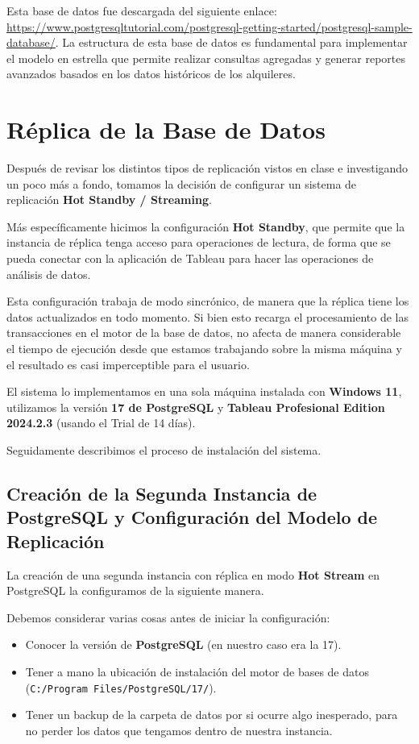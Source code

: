 \documentclass{article}
\begin{document}
Esta base de datos fue descargada del siguiente enlace: \url{https://www.postgresqltutorial.com/postgresql-getting-started/postgresql-sample-database/}. La estructura de esta base de datos es fundamental para implementar el modelo en estrella que permite realizar consultas agregadas y generar reportes avanzados basados en los datos históricos de los alquileres.

\newpage
\section{Réplica de la Base de Datos}

Después de revisar los distintos tipos de replicación vistos en clase e investigando un poco más a fondo, tomamos la decisión de configurar un sistema de replicación \textbf{Hot Standby / Streaming}.

Más específicamente hicimos la configuración \textbf{Hot Standby}, que permite que la instancia de réplica tenga acceso para operaciones de lectura, de forma que se pueda conectar con la aplicación de Tableau para hacer las operaciones de análisis de datos.

Esta configuración trabaja de modo sincrónico, de manera que la réplica tiene los datos actualizados en todo momento. Si bien esto recarga el procesamiento de las transacciones en el motor de la base de datos, no afecta de manera considerable el tiempo de ejecución desde que estamos trabajando sobre la misma máquina y el resultado es casi imperceptible para el usuario.

El sistema lo implementamos en una sola máquina instalada con \textbf{Windows 11}, utilizamos la versión \textbf{17 de PostgreSQL} y \textbf{Tableau Profesional Edition 2024.2.3} (usando el Trial de 14 días).

Seguidamente describimos el proceso de instalación del sistema.

\subsection{Creación de la Segunda Instancia de PostgreSQL y Configuración del Modelo de Replicación}

La creación de una segunda instancia con réplica en modo \textbf{Hot Stream} en PostgreSQL la configuramos de la siguiente manera.

Debemos considerar varias cosas antes de iniciar la configuración:
\begin{itemize}
    \item Conocer la versión de \textbf{PostgreSQL} (en nuestro caso era la 17).
    \item Tener a mano la ubicación de instalación del motor de bases de datos (\texttt{C:/Program Files/PostgreSQL/17/}).
    \item Tener un backup de la carpeta de datos por si ocurre algo inesperado, para no perder los datos que tengamos dentro de nuestra instancia.
\end{itemize}
\end{document}
